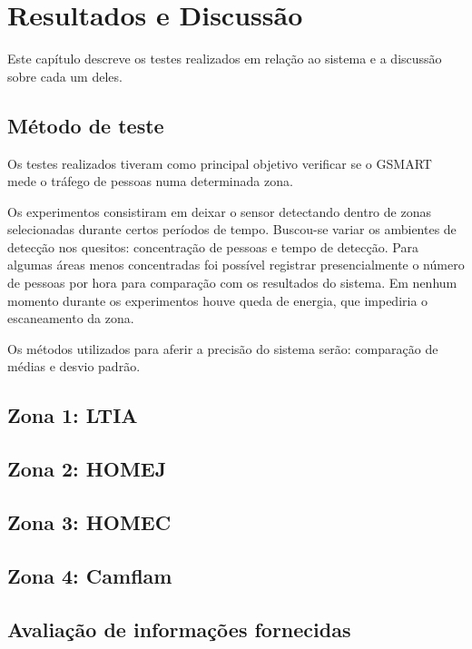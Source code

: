 \chapter{Resultados e Discussão}
\label{resultados-discussao}

Este capítulo descreve os testes realizados em relação ao sistema e a discussão sobre cada um deles.

\section{Método de teste}
\label{metodo-teste}
Os testes realizados tiveram como principal objetivo verificar se o GSMART mede o tráfego
de pessoas numa determinada zona.

Os experimentos consistiram em deixar o sensor detectando dentro de zonas
selecionadas durante certos períodos de tempo. Buscou-se variar os ambientes de
detecção nos quesitos: concentração de pessoas e tempo de detecção. Para algumas
áreas menos concentradas foi possível registrar presencialmente o número de
pessoas por hora para comparação com os resultados do sistema. Em nenhum momento durante os experimentos
houve queda de energia, que impediria o escaneamento da zona.

Os métodos utilizados para aferir a precisão do sistema serão: comparação de médias e desvio padrão.

\section{Zona 1: LTIA}
\label{ltia-zone}

\section{Zona 2: HOMEJ}
\label{homej-zone}

\section{Zona 3: HOMEC}
\label{homec-zone}

\section{Zona 4: Camflam}
\label{camflam-zone}

\section{Avaliação de informações fornecidas}
\label{avalia-info}

